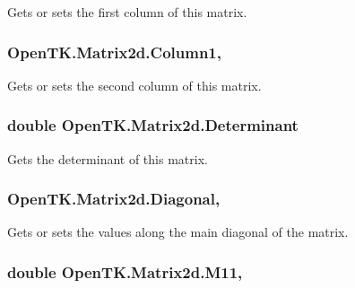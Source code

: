 Gets or sets the first column of this matrix. 

\hypertarget{struct_open_t_k_1_1_matrix2d_a83cbf7e42a8198467fa04832da210260}{
\subsubsection[{Column1}]{ Open\-T\-K.\-Matrix2d.\-Column1\hspace{0.3cm}{\ttfamily [get]}, {\ttfamily [set]}}}\label{struct_open_t_k_1_1_matrix2d_a83cbf7e42a8198467fa04832da210260}


Gets or sets the second column of this matrix. 

\hypertarget{struct_open_t_k_1_1_matrix2d_a9778b5f32cdac2c35a838327a73ba82c}{
\subsubsection[{Determinant}]{\setlength{\rightskip}{0pt plus 5cm}double Open\-T\-K.\-Matrix2d.\-Determinant\hspace{0.3cm}{\ttfamily [get]}}}\label{struct_open_t_k_1_1_matrix2d_a9778b5f32cdac2c35a838327a73ba82c}


Gets the determinant of this matrix. 

\hypertarget{struct_open_t_k_1_1_matrix2d_a2c4c37b943b8fe801b135547ba7858a4}{
\subsubsection[{Diagonal}]{ Open\-T\-K.\-Matrix2d.\-Diagonal\hspace{0.3cm}{\ttfamily [get]}, {\ttfamily [set]}}}\label{struct_open_t_k_1_1_matrix2d_a2c4c37b943b8fe801b135547ba7858a4}


Gets or sets the values along the main diagonal of the matrix. 

\hypertarget{struct_open_t_k_1_1_matrix2d_ab41b4dd160bb33fa9912ffad44fe5a79}{
\subsubsection[{M11}]{\setlength{\rightskip}{0pt plus 5cm}double Open\-T\-K.\-Matrix2d.\-M11\hspace{0.3cm}{\ttfamily [get]}, {\ttfamily [set]}}}\label{struct_open_t_k_1_1_matrix2d_ab41b4dd160bb33fa9912ffad44fe5a79}


